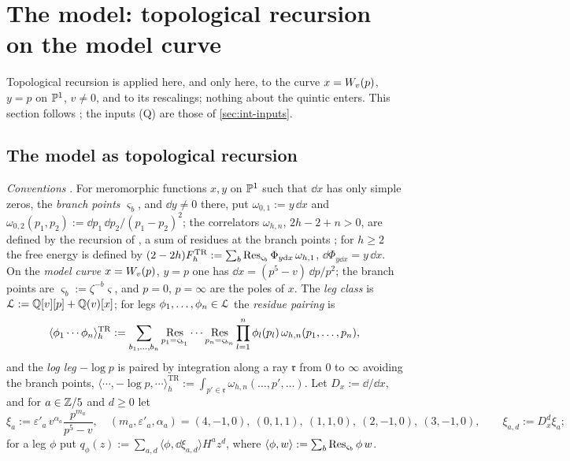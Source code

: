 \section{The model: topological recursion on the model curve}
\label{sec:mod}

Topological recursion is applied here, and only here, to the curve $x=W_{v}(p)$, $y=p$ on $\mathbb{P}^1$, $v\neq0$, and to its rescalings; nothing about the quintic enters. This section follows ; the inputs (Q) are those of \cref{sec:int-inputs}.

\subsection{The model as topological recursion}
\label{sec:mod-tr}

\emph{Conventions} . For meromorphic functions $x,y$ on $\mathbb{P}^1$ such that $\dd x$ has only simple zeros, the \emph{branch points} $\varsigma_b$, and $\dd y\neq0$ there, put $\omega_{0,1}:=y\,\dd x$ and $\omega_{0,2}(p_1,p_2):=\dd p_1\,\dd p_2/(p_1-p_2)^2$; the correlators $\omega_{h,n}$, $2h-2+n>0$, are defined by the recursion of \cite[(2-26)--(2-29)]{Dunin-Barkowski:2015caa}, a sum of residues at the branch points ; for $h\geq2$ the free energy is defined by $(2-2h)F^{\mathrm{TR}}_h:=\sum_b\operatorname*{Res}_{\varsigma_b}\Phi_{y\mathrm{d} x}\,\omega_{h,1}$, $\dd\Phi_{y\dd x}=y\,\dd x$. On the \emph{model curve} $x=W_{v}(p)$, $y=p$ one has $\dd x=(p^5-v)\,\dd p/p^2$; the branch points are $\varsigma_b:=\zeta^{-b}\varsigma$, and $p=0$, $p=\infty$ are the poles of $x$. The \emph{leg class} is $\mathcal{L}:=\mathbb{Q}[v][p]+\mathbb{Q}(v)[x]$; for legs $\phi_1,\dots,\phi_n\in\mathcal{L}$ the \emph{residue pairing} is
\[
\langle\phi_1\cdots\phi_n\rangle^{\mathrm{TR}}_h:=\sum_{b_1,\dots,b_n}\operatorname*{Res}_{p_1=\varsigma_{b_1}}\cdots\operatorname*{Res}_{p_n=\varsigma_{b_n}}\prod_{l=1}^n\phi_l(p_l)\,\omega_{h,n}(p_1,\dots,p_n),
\]
and the \emph{log leg} $-\log p$ is paired by integration along a ray $\mathfrak r$ from $0$ to $\infty$ avoiding the branch points, $\langle\cdots,-\log p,\cdots\rangle^{\mathrm{TR}}_h:=\int_{p'\in\mathfrak r}\omega_{h,n}(\dots,p',\dots)$. Let $D_x:=\dd/\dd x$, and for $a\in\mathbb{Z}/5$ and $d\geq0$ let
\[
\xi_a:=\varepsilon'_a\,v^{\alpha_a}\frac{p^{m_a}}{p^5-v},\quad(m_a,\varepsilon'_a,\alpha_a)=(4,-1,0),\ (0,1,1),\ (1,1,0),\ (2,-1,0),\ (3,-1,0),\qquad\xi_{a,d}:=D_x^d\xi_a ;
\]
for a leg $\phi$ put $q_\phi(z):=\sum_{a,d}\langle\phi,\dd\xi_{a,d}\rangle H^az^d$, where $\langle\phi,w\rangle:=\sum_b\operatorname*{Res}_{\varsigma_b}\phi\,w$.

